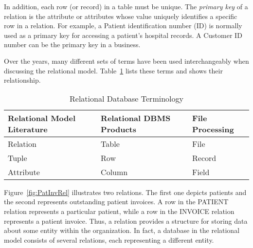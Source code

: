 In addition, each row (or record) in a table must be unique.  The {\em
primary key} of a relation is the attribute or attributes whose value
uniquely identifies a specific row in a relation.  For example, a
Patient identification number (ID) is normally used as a primary key
for accessing a patient's hospital records.  A Customer ID number can
be the primary key in a business.

Over the years, many different sets of terms have been used
interchangeably when discussing the relational model.
Table~\ref{tab:RelDBTerm} lists these terms and shows their
relationship.

\begin{table}
\caption{Relational Database Terminology}{\label{tab:RelDBTerm}}
\begin{center}
\begin{tabular}{|l|l|l|} \hline
Relational Model Literature & Relational DBMS Products & File Processing \\ \hline\hline
Relation                    & Table                    & File   \\
Tuple                       & Row                      & Record \\
Attribute                   & Column                   & Field  \\ \hline
\end{tabular}
\end{center}
\end{table}

Figure~\ref{fig:PatInvRel} illustrates two relations.  The first one
depicts patients and the second represents outstanding patient
invoices.  A row in the PATIENT relation represents a particular
patient, while a row in the INVOICE relation represents a patient
invoice.  Thus, a relation provides a structure for storing data about
some entity within the organization.  In fact, a database in the
relational model consists of several relations, each representing a
different entity.

